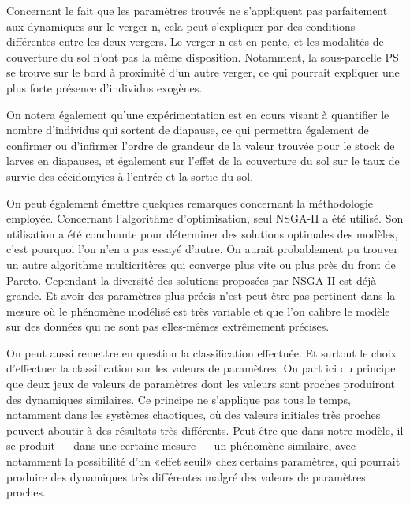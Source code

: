 Concernant le fait que les paramètres trouvés ne s'appliquent pas parfaitement aux dynamiques sur le verger n, cela peut s'expliquer par des conditions différentes entre les deux vergers.
Le verger n est en pente, et les modalités de couverture du sol n'ont pas la même disposition.
Notamment, la sous-parcelle PS se trouve sur le bord à proximité d'un autre verger, ce qui pourrait expliquer une plus forte présence d'individus exogènes.

On notera également qu'une expérimentation est en cours visant à quantifier le nombre d'individus qui sortent de diapause, ce qui permettra également de confirmer ou d'infirmer l'ordre de grandeur de la valeur trouvée pour le stock de larves en diapauses, et également sur l'effet de la couverture du sol sur le taux de survie des cécidomyies à l'entrée et la sortie du sol.


On peut également émettre quelques remarques concernant la méthodologie employée.
Concernant l'algorithme d'optimisation, seul NSGA-II a été utilisé.
Son utilisation a été concluante pour déterminer des solutions optimales des modèles, c'est pourquoi l'on n'en a pas essayé d'autre.
On aurait probablement pu trouver un autre algorithme multicritères qui converge plus vite ou plus près du front de Pareto.
Cependant la diversité des solutions proposées par NSGA-II est déjà grande.
Et avoir des paramètres plus précis n'est peut-être pas pertinent dans la mesure où le phénomène modélisé est très variable et que l'on calibre le modèle sur des données qui ne sont pas elles-mêmes extrêmement précises.

On peut aussi remettre en question la classification effectuée.
Et surtout le choix d'effectuer la classification sur les valeurs de paramètres.
On part ici du principe que deux jeux de valeurs de paramètres dont les valeurs sont proches produiront des dynamiques similaires.
Ce principe ne s'applique pas tous le temps, notamment dans les systèmes chaotiques, où des valeurs initiales très proches peuvent aboutir à des résultats très différents.
Peut-être que dans notre modèle, il se produit --- dans une certaine mesure --- un phénomène similaire, avec notamment la possibilité d'un «effet seuil» chez certains paramètres, qui pourrait produire des dynamiques très différentes malgré des valeurs de paramètres proches.
